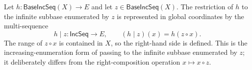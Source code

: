 \begin{definition}
Let $h:\mathsf{BaseIncSeq}(X)\to E$ and let
$z\in\mathsf{BaseIncSeq}(X)$.  The restriction of $h$ to the infinite
subbase enumerated by $z$ is represented in global coordinates by the
multi-sequence
\[
h\mathbin{|}z:\mathsf{IncSeq}\to E,\qquad
(h\mathbin{|}z)(x)=h(z\circ x).
\]
The range of $z\circ x$ is contained in $X$, so the right-hand side is
defined.  This is the increasing-enumeration form of passing to the
infinite subbase enumerated by $z$; it deliberately differs from the
right-composition operation $x\mapsto x\circ z$.
\end{definition}
